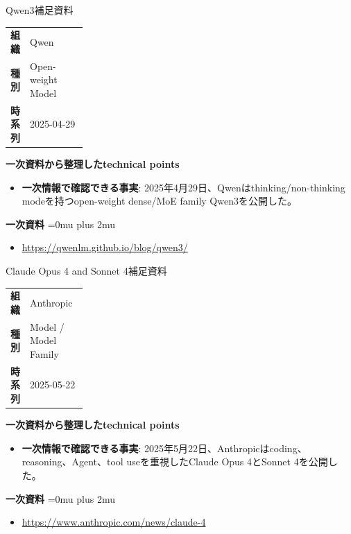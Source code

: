 \begin{technicalnote}{Qwen3}{補足資料}
\begingroup
\begin{tabularx}{\linewidth}{@{}>{\bfseries}p{0.22\linewidth}X@{}}
組織 & Qwen \\
種別 & Open-weight Model \\
時系列 & 2025-04-29 \\
\end{tabularx}
\smallskip
{\bfseries 一次資料から整理したtechnical points}
\begin{itemize}[leftmargin=1.5em,itemsep=0.35em]
\item \textbf{一次情報で確認できる事実}: 2025年4月29日、Qwenはthinking/non-thinking modeを持つopen-weight dense/MoE family Qwen3を公開した。
\end{itemize}
\begin{samepage}
{\bfseries 一次資料}
\begingroup\sloppy
\Urlmuskip=0mu plus 2mu\relax
\begin{itemize}[leftmargin=1.5em,itemsep=0.25em]
\item {\scriptsize\url{https://qwenlm.github.io/blog/qwen3/}}
\end{itemize}
\endgroup
\end{samepage}
\endgroup
\end{technicalnote}
\medskip

\begin{technicalnote}{Claude Opus 4 and Sonnet 4}{補足資料}
\begingroup
\begin{tabularx}{\linewidth}{@{}>{\bfseries}p{0.22\linewidth}X@{}}
組織 & Anthropic \\
種別 & Model / Model Family \\
時系列 & 2025-05-22 \\
\end{tabularx}
\smallskip
{\bfseries 一次資料から整理したtechnical points}
\begin{itemize}[leftmargin=1.5em,itemsep=0.35em]
\item \textbf{一次情報で確認できる事実}: 2025年5月22日、Anthropicはcoding、reasoning、Agent、tool useを重視したClaude Opus 4とSonnet 4を公開した。
\end{itemize}
\begin{samepage}
{\bfseries 一次資料}
\begingroup\sloppy
\Urlmuskip=0mu plus 2mu\relax
\begin{itemize}[leftmargin=1.5em,itemsep=0.25em]
\item {\scriptsize\url{https://www.anthropic.com/news/claude-4}}
\end{itemize}
\endgroup
\end{samepage}
\endgroup
\end{technicalnote}
\medskip

